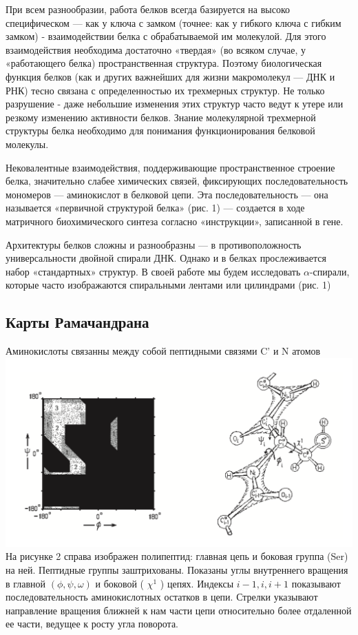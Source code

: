 \documentclass[
11pt,%
tightenlines,%
twoside,%
onecolumn,%
nofloats,%
nobibnotes,%
nofootinbib,%
superscriptaddress,%
noshowpacs,%
centertags]%
{revtex4}
\begin{document}
При всем разнообразии, работа белков всегда базируется на высоко специфическом — как у ключа с замком (точнее: как у гибкого ключа с гибким замком) - взаимодействии белка с обрабатываемой им молекулой. Для этого взаимодействия необходима достаточно «твердая» (во всяком случае, у «работающего белка) пространственная структура. Поэтому биологическая функция белков (как и других важнейших для жизни макромолекул — ДНК и РНК) тесно связана с определенностью их трехмерных структур. Не только разрушение - даже небольшие изменения этих структур часто ведут к утере или резкому изменению активности белков.
Знание молекулярной трехмерной структуры белка необходимо для понимания функционирования белковой молекулы. 

Нековалентные взаимодействия, поддерживающие пространственное строение белка, значительно слабее химических связей, фиксирующих последовательность мономеров — аминокислот в белковой цепи. Эта
последовательность — она называется «первичной структурой белка» (рис. 1) — создается в ходе матричного биохимического синтеза согласно «инструкции», записанной в гене.

Архитектуры белков сложны и разнообразны — в противоположность универсальности двойной спирали ДНК. Однако и в белках прослеживается набор «стандартных» структур.
В своей работе мы будем исследовать $\alpha$-спирали, которые часто изображаются спиральными лентами или цилиндрами (рис. 1)


\subsection{Карты Рамачандрана}

Аминокислоты связанны между собой пептидными связями C' и N атомов
\includegraphics[width=\textwidth]{map}
На рисунке 2 справа изображен полипептид: главная цепь и боковая группа (Ser) на ней. Пептидные группы заштрихованы. Показаны углы внутреннего вращения в главной $(\phi, \psi, \omega)$ и боковой ( $\chi^1$ ) цепях. Индексы $i-1, i, i+1$ показывают последовательность аминокислотных остатков в цепи. Стрелки указывают направление вращения ближней к нам части цепи относительно более отдаленной ее части, ведущее к росту угла поворота. 
\end{document}
